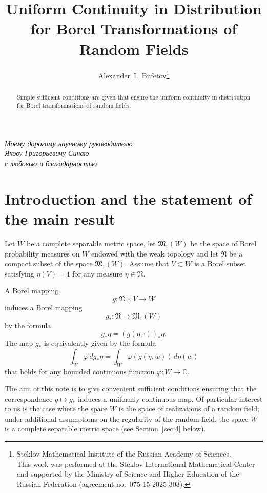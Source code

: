 \documentclass[12pt,a4paper]{article}
\title{Uniform Continuity in Distribution for Borel Transformations of Random Fields}
\author{Alexander~I.~Bufetov\thanks{Steklov Mathematical Institute of the Russian Academy of Sciences.\\
		This work was performed at the Steklov International Mathematical Center and supported by the Ministry of
		Science and Higher Education of the Russian Federation (agreement no.~075-15-2025-303).}}
\date{}
\theoremstyle{definition}
\theoremstyle{remark}
\newcommand{\MM}{{\mathfrak{M}}}
\newcommand{\NN}{{\mathfrak{N}}}
\begin{document}
	
	\maketitle
	
	\begin{flushright}
		{\it{Моему дорогому научному руководителю\\
		Якову Григорьевичу Синаю\\
		с любовью и благодарностью.}}
	\end{flushright}
	
	\begin{abstract}
		Simple sufficient conditions are given that ensure the uniform continuity in distribution for Borel transformations of random fields.
	\end{abstract}
	
	\section{Introduction and the statement of the main result}
	
	Let $W$ be a complete separable metric space, let $\MM_1(W)$ be the space  of
	Borel probability measures on $W$ endowed with the weak topology and let $\NN$ be a compact subset of the space $\MM_1(W)$. Assume that $V \subset W$ is a Borel
	subset satisfying $\eta(V) = 1$ for any measure $\eta \in \NN$.
	
	A Borel mapping
	\begin{equation}
		g \colon \NN \times V \to W
		\label{eq:g}
	\end{equation}
	induces a Borel mapping
	\begin{equation}
		g_* \colon \NN \to \MM_1(W)
		\label{eq:pushforward-def}
	\end{equation}
	by the formula
	\begin{equation}
		g_* \eta = (g(\eta, \cdot))_* \eta.
		\label{eq:pushforward}
	\end{equation}
	The map $g_*$ is equivalently given by the formula
	\begin{equation}
		\int_W \varphi \, d g_* \eta = \int_W \varphi(g(\eta, w)) \, d\eta(w)
		\label{eq:phi}
	\end{equation}
	that holds for any bounded continuous function $\varphi \colon W \to \mathbb{C}$.
	
	The aim of this note is to give convenient sufficient conditions ensuring that the correspondence
	$g \mapsto g_*$ induces a uniformly continuous map. Of particular interest to us is the case where the space $W$
	is the space of realizations of a random field; under additional assumptions on the
	regularity of the random field, the space $W$ is a complete separable metric space (see Section~\ref{sec:4} below).
	
\end{document}
